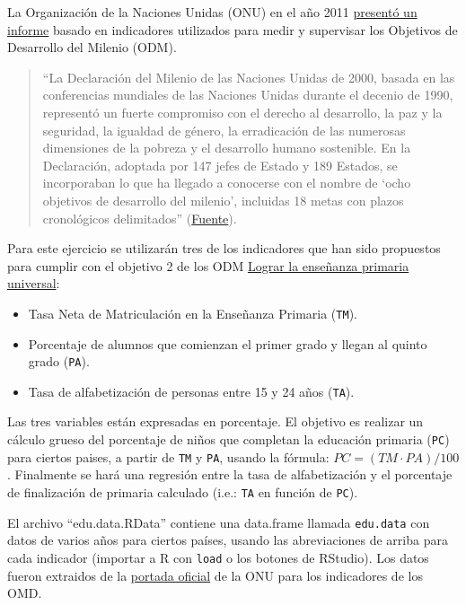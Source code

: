\documentclass[]{article}
\begin{document}
La Organización de la Naciones Unidas (ONU) en el año 2011
\href{http://mdgs.un.org/unsd/mdg/Resources/Static/Products/Progress2011/11-31342\%20\%28S\%29\%20MDG\%20Report\%202011\_Book\%20LR.pdf}{presentó
un informe} basado en indicadores utilizados para medir y supervisar los
Objetivos de Desarrollo del Milenio (ODM).

\begin{quote}
``La Declaración del Milenio de las Naciones Unidas de 2000, basada en
las conferencias mundiales de las Naciones Unidas durante el decenio de
1990, representó un fuerte compromiso con el derecho al desarrollo, la
paz y la seguridad, la igualdad de género, la erradicación de las
numerosas dimensiones de la pobreza y el desarrollo humano sostenible.
En la Declaración, adoptada por 147 jefes de Estado y 189 Estados, se
incorporaban lo que ha llegado a conocerse con el nombre de `ocho
objetivos de desarrollo del milenio', incluidas 18 metas con plazos
cronológicos delimitados''
(\href{http://unstats.un.org/unsd/publication/seriesf/Seriesf\_95s.pdf}{Fuente}).

\end{quote}
Para este ejercicio se utilizarán tres de los indicadores que han sido
propuestos para cumplir con el objetivo 2 de los ODM
\href{http://www.undp.org/content/undp/es/home/mdgoverview/mdg\_goals/mdg2/}{Lograr
la enseñanza primaria universal}:

\begin{itemize}
\item
  Tasa Neta de Matriculación en la Enseñanza Primaria (\texttt{TM}).
\item
  Porcentaje de alumnos que comienzan el primer grado y llegan al quinto
  grado (\texttt{PA}).
\item
  Tasa de alfabetización de personas entre 15 y 24 años (\texttt{TA}).
\end{itemize}
Las tres variables están expresadas en porcentaje. El objetivo es
realizar un cálculo grueso del porcentaje de niños que completan la
educación primaria (\texttt{PC}) para ciertos paises, a partir de
\texttt{TM} y \texttt{PA}, usando la fórmula:
$PC = (TM \cdot PA) / 100$. Finalmente se hará una regresión entre la
tasa de alfabetización y el porcentaje de finalización de primaria
calculado (i.e.: \texttt{TA} en función de \texttt{PC}).

El archivo ``edu.data.RData'' contiene una data.frame llamada
\texttt{edu.data} con datos de varios años para ciertos países, usando
las abreviaciones de arriba para cada indicador (importar a R con
\texttt{load} o los botones de RStudio). Los datos fueron extraidos de
la \href{http://mdgs.un.org/unsd/mdg/Data.aspx}{portada oficial} de la
ONU para los indicadores de los OMD.
\end{document}
